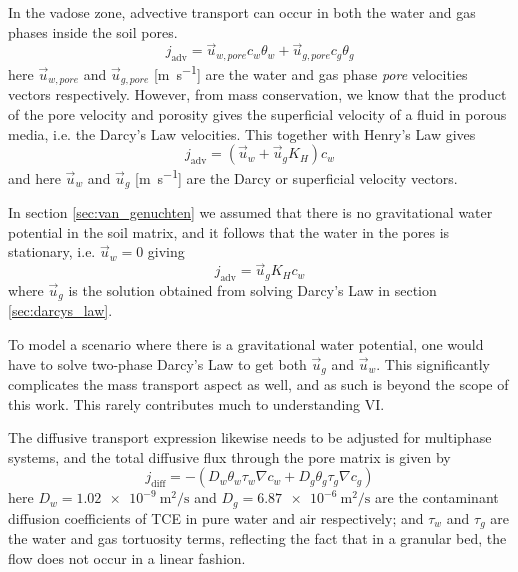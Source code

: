 In the vadose zone, advective transport can occur in both the water and gas phases inside the soil pores.
\begin{equation}
  j_\mathrm{adv} = \vec{u}_{w,pore} c_w \theta_w + \vec{u}_{g,pore} c_g \theta_g
\end{equation}
here $\vec{u}_{w,pore}$ and $\vec{u}_{g,pore}$ [\si{\metre\per\second}] are the water and gas phase \textit{pore} velocities vectors respectively.
However, from mass conservation, we know that the product of the pore velocity and porosity gives the superficial velocity of a fluid in porous media, i.e. the Darcy's Law velocities.
This together with Henry's Law gives
\begin{equation}
  j_\mathrm{adv} = (\vec{u}_w + \vec{u}_g K_H ) c_w
\end{equation}
and here $\vec{u}_w$ and $\vec{u}_g$ [\si{\metre\per\second}] are the Darcy or superficial velocity vectors.\par

In section \ref{sec:van_genuchten} we assumed that there is no gravitational water potential in the soil matrix, and it follows that the water in the pores is stationary, i.e. $\vec{u}_w = 0$ giving
\begin{equation}
  j_\mathrm{adv} = \vec{u}_g K_H c_w
\end{equation}
where $\vec{u}_g$ is the solution obtained from solving Darcy's Law in section \ref{sec:darcys_law}.\par

To model a scenario where there is a gravitational water potential, one would have to solve two-phase Darcy's Law to get both $\vec{u}_g$ and $\vec{u}_w$.
This significantly complicates the mass transport aspect as well, and as such is beyond the scope of this work.
This rarely contributes much to understanding VI.\par

The diffusive transport expression likewise needs to be adjusted for multiphase systems, and the total diffusive flux through the pore matrix is given by
\begin{equation}
  j_\mathrm{diff} = -(D_w \theta_w \tau_w \nabla c_w + D_g \theta_g \tau_g \nabla c_g)
\end{equation}
here $D_w = \SI{1.02e-9}{\metre\squared\per\second}$ and $D_g = \SI{6.87e-6}{\metre\squared\per\second}$ are the contaminant diffusion coefficients of TCE in pure water and air respectively;
and $\tau_w$ and $\tau_g$ are the water and gas tortuosity terms, reflecting the fact that in a granular bed, the flow does not occur in a linear fashion.\par

